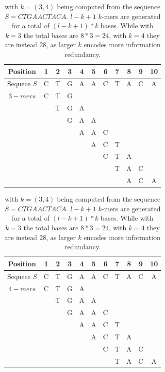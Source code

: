\begin{table}[h!]
\begin{center}

	\begin{tabular}{ c c c c c c c c c c c}
		\toprule
		Position & 1 & 2 & 3 & 4 & 5 & 6 & 7 & 8 & 9 & 10 \\
		\midrule
		Sequece $S$ & C & T & G & A & A & C & T &A & C & A\\
		\midrule 
		$3-mers$ & C & T & G  \\
		&   & T & G & A \\
		&   &  & G & A & A \\
		&   &  &  & A & A & C\\
		&   &  &  &  & A & C & T\\
		&   &  &  &  &  & C & T & A \\
		&   &  &  &  &  &  & T & A & C \\
		&   &  &  &  &  & & & A & C & A\\
		
		\hline
	\end{tabular}

	\vspace*{0.3 cm}

	\centering
	\begin{tabular}{ c c c c c c c c c c c}
	\toprule
	Position & 1 & 2 & 3 & 4 & 5 & 6 & 7 & 8 & 9 & 10 \\
	\midrule
	Sequece $S$ & C & T & G & A & A & C & T &A & C & A\\
	\midrule 
	$4-mers$ & C & T & G & A \\
	&   & T & G & A & A\\
	&   &  & G & A & A & C\\
	&   &  &  & A & A & C & T\\
	&   &  &  &  & A & C & T & A\\
	&   &  &  &  &  & C & T & A & C\\
	&   &  &  &  &  &  & T & A & C & A\\

	
	\bottomrule
\end{tabular}
	\caption[\kmer computation from a sequence]{\kmers with $k=(3,4)$ being computed from the sequence $S = CTGAACTACA $. $l-k +1$ $k$-mers are generated for a total of $(l -k + 1) * k$ bases. While with $k=3$ the total bases are $ 8 * 3 = 24$, with $k=4$ they are instead $28$, as larger $k$ encodes more information redundancy.}
	\label{tab-kmers}
\end{center}
\end{table}


